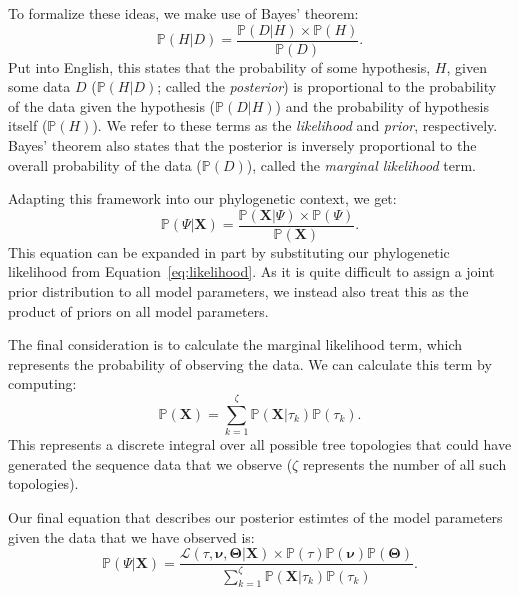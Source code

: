 To formalize these ideas, we make use of Bayes' theorem:
\begin{equation}
  \mathbb{P}(H|D) = \frac{\mathbb{P}(D|H) \times \mathbb{P}(H)}{\mathbb{P}(D)}.
\end{equation}
Put into English, this states that the probability of some hypothesis, $H$, given some data $D$ ($\mathbb{P}(H|D)$; called the \textit{posterior}) is proportional to the probability of the data given the hypothesis ($\mathbb{P}(D|H)$) and the probability of hypothesis itself ($\mathbb{P}(H)$).
We refer to these terms as the \textit{likelihood} and \textit{prior}, respectively.
Bayes' theorem also states that the posterior is inversely proportional to the overall probability of the data ($\mathbb{P}(D)$), called the \textit{marginal likelihood} term.

Adapting this framework into our phylogenetic context, we get:
\begin{equation}
  \mathbb{P}(\Psi|\mathbf{X}) = \frac{\mathbb{P}(\mathbf{X}|\Psi) \times \mathbb{P}(\Psi)}{\mathbb{P}(\mathbf{X})}.
\end{equation}
This equation can be expanded in part by substituting our phylogenetic likelihood from Equation~\ref{eq:likelihood}.
As it is quite difficult to assign a joint prior distribution to all model parameters, we instead also treat this as the product of priors on all model parameters.

The final consideration is to calculate the marginal likelihood term, which represents the probability of observing the data.
We can calculate this term by computing:
\begin{equation}
  \label{eq:marginalTerm}
  \mathbb{P}(\mathbf{X}) = \sum_{k=1}^{\zeta} \mathbb{P}(\mathbf{X}|\tau_k)\mathbb{P}(\tau_k).
\end{equation}
This represents a discrete integral over all possible tree topologies that could have generated the sequence data that we observe ($\zeta$ represents the number of all such topologies).

Our final equation that describes our posterior estimtes of the model parameters given the data that we have observed is:
\begin{equation}
  \label{eq:posteriorLikelihood}
  \mathbb{P}(\Psi|\mathbf{X}) = 
    \frac{\mathcal{L}(\tau,\mathbf{\nu},\mathbf{\Theta}|\mathbf{X}) \times \mathbb{P}(\tau)\mathbb{P}(\mathbf{\nu})\mathbb{P}(\mathbf{\Theta})}
    {\sum_{k=1}^{\zeta} \mathbb{P}(\mathbf{X}|\tau_k)\mathbb{P}(\tau_k)}.
\end{equation}


